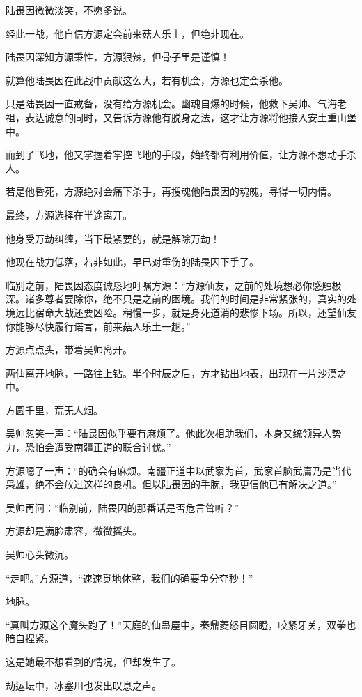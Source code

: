 \begin{this_body}
陆畏因微微淡笑，不愿多说。

经此一战，他自信方源定会前来菇人乐土，但绝非现在。

陆畏因深知方源秉性，方源狠辣，但骨子里是谨慎！

就算他陆畏因在此战中贡献这么大，若有机会，方源也定会杀他。

只是陆畏因一直戒备，没有给方源机会。幽魂自爆的时候，他救下吴帅、气海老祖，表达诚意的同时，又告诉方源他有脱身之法，这才让方源将他接入安土重山堡中。

而到了飞地，他又掌握着掌控飞地的手段，始终都有利用价值，让方源不想动手杀人。

若是他昏死，方源绝对会痛下杀手，再搜魂他陆畏因的魂魄，寻得一切内情。

最终，方源选择在半途离开。

他身受万劫纠缠，当下最紧要的，就是解除万劫！

他现在战力低落，若非如此，早已对重伤的陆畏因下手了。

临别之前，陆畏因态度诚恳地叮嘱方源：“方源仙友，之前的处境想必你感触极深。诸多尊者要除你，绝不只是之前的困境。我们的时间是非常紧张的，真实的处境远比宿命大战还要凶险。稍慢一步，就是身死道消的悲惨下场。所以，还望仙友你能够尽快履行诺言，前来菇人乐土一趟。”

方源点点头，带着吴帅离开。

两仙离开地脉，一路往上钻。半个时辰之后，方才钻出地表，出现在一片沙漠之中。

方圆千里，荒无人烟。

吴帅忽笑一声：“陆畏因似乎要有麻烦了。他此次相助我们，本身又统领异人势力，恐怕会遭受南疆正道的联合讨伐。”

方源嗯了一声：“的确会有麻烦。南疆正道中以武家为首，武家首脑武庸乃是当代枭雄，绝不会放过这样的良机。但以陆畏因的手腕，我更信他已有解决之道。”

吴帅再问：“临别前，陆畏因的那番话是否危言耸听？”

方源却是满脸肃容，微微摇头。

吴帅心头微沉。

“走吧。”方源道，“速速觅地休整，我们的确要争分夺秒！”

地脉。

“真叫方源这个魔头跑了！”天庭的仙蛊屋中，秦鼎菱怒目圆瞪，咬紧牙关，双拳也暗自捏紧。

这是她最不想看到的情况，但却发生了。

劫运坛中，冰塞川也发出叹息之声。


\end{this_body}
